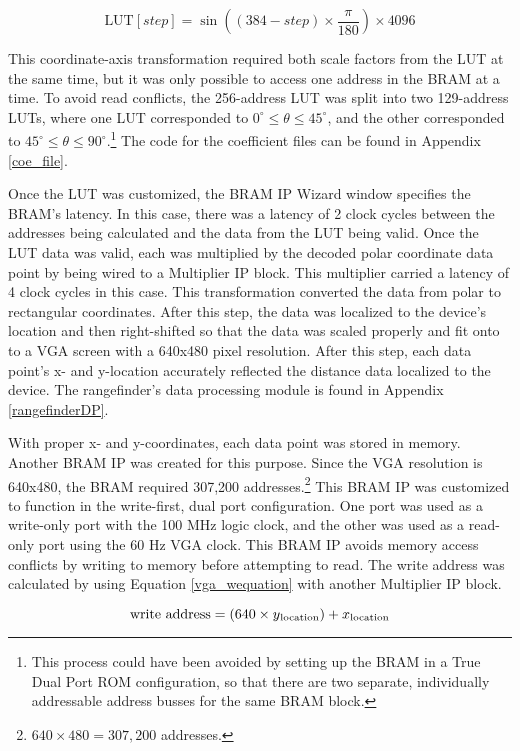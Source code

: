 \begin{equation}
	\textrm{LUT}[step] = \sin((384-step)\times\dfrac{\pi}{180})\times4096
	\label{coe}
\end{equation}

This coordinate-axis transformation required both scale factors from the LUT at the same time, but it was only possible to access one address in the BRAM at a time. To avoid read conflicts, the 256-address LUT was split into two 129-address LUTs, where one LUT corresponded to $0^\circ{}\leq{}\theta{}\leq45^\circ$, and the other corresponded to $45^\circ{}\leq{}\theta{}\leq90^\circ$.\footnote{ This process could have been avoided by setting up the BRAM in a True Dual Port ROM configuration, so that there are two separate, individually addressable address busses for the same BRAM block.} The code for the coefficient files can be found in Appendix \ref{coe_file}.
\par
Once the LUT was customized, the BRAM IP Wizard window specifies the BRAM's latency. In this case, there was a latency of 2 clock cycles between the addresses being calculated and the data from the LUT being valid. Once the LUT data was valid, each was multiplied by the decoded polar coordinate data point by being wired to a Multiplier IP block. This multiplier carried a latency of 4 clock cycles in this case. This transformation converted the data from polar to rectangular coordinates. After this step, the data was localized to the device's location and then right-shifted so that the data was scaled properly and fit onto to a VGA screen with a 640x480 pixel resolution. After this step, each data point's x- and y-location accurately reflected the distance data localized to the device. The rangefinder's data processing module is found in Appendix \ref{rangefinderDP}.
\par
With proper x- and y-coordinates, each data point was stored in memory. Another BRAM IP was created for this purpose. Since the VGA resolution is 640x480, the BRAM required 307,200 addresses.\footnote{ $640\times480 = 307,200$ addresses.} This BRAM IP was customized to function in the write-first, dual port configuration. One port was used as a write-only port with the 100 MHz logic clock, and the other was used as a read-only port using the 60 Hz VGA clock. This BRAM IP avoids memory access conflicts by writing to memory before attempting to read. The write address was calculated by using Equation \ref{vga_wequation} with another Multiplier IP block.

\begin{equation}
	\textrm{write address} = (640\times{}y\textsubscript{location})+ x\textsubscript{location}
	\label{vga_wequation}
\end{equation}

